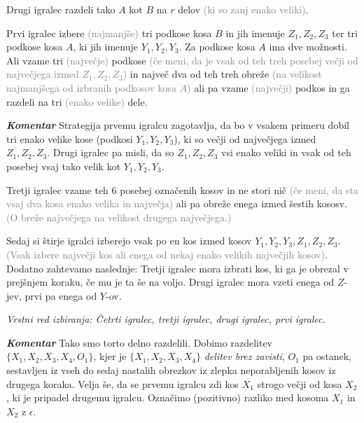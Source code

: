 \documentclass[a4paper,12pt]{article}
\begin{document}
\begin{protokol}
\item Drugi igralec razdeli tako $A$ kot $B$ na $r$ delov \textcolor{gray}{(ki so zanj enako veliki)}.

\item Prvi igralec izbere \textcolor{gray}{(najmanjše)} tri podkose kosa $B$ in jih imenuje $Z_1, Z_2, Z_3$ ter tri podkose kosa $A$, ki jih imenuje $Y_1, Y_2, Y_3$. Za podkose kosa $A$ ima dve možnosti. Ali vzame tri \textcolor{gray}{(največje)} podkose \textcolor{gray}{(če meni, da je vsak od teh treh posebej večji od največjega izmed $Z_1, Z_2, Z_3$)} in največ dva od teh treh obreže \textcolor{gray}{(na velikost najmanjšega od izbranih podkosov kosa $A$)} ali pa vzame \textcolor{gray}{(največji)} podkos in ga razdeli na tri \textcolor{gray}{(enako velike)} dele.

\item [\textbf{\em Komentar}] Strategija prvemu igralcu zagotavlja, da bo v vsakem primeru dobil tri enako velike kose (podkosi $Y_1, Y_2, Y_3$), ki so večji od največjega izmed $Z_1, Z_2, Z_3$. Drugi igralec pa misli, da so $Z_1, Z_2, Z_3$ vsi enako veliki in vsak od teh posebej vsaj tako velik kot $Y_1, Y_2, Y_3$.

\item Tretji igralec vzame teh 6 posebej označenih kosov in ne stori nič \textcolor{gray}{(če meni, da sta vsaj dva kosa enako velika in največja)} ali pa obreže enega izmed šestih kososv. \textcolor{gray}{(O breže največjega na velikost drugega največjega.)}

\item  Sedaj si štirje igralci izberejo vsak po en kos izmed kosov $Y_1, Y_2, Y_3, Z_1, Z_2, Z_3$. \textcolor{gray}{(Vsak izbere največji kos ali enega od nekaj enako velikih največjih kosov)}. Dodatno zahtevamo naslednje: Tretji igralec mora izbrati kos, ki ga je obrezal v prejšnjem koraku, če mu je ta še na voljo. Drugi igralec mora vzeti enega od $Z$-jev, prvi pa enega od $Y$-ov.

\textsl{Vrstni red izbiranja: Četrti igralec, tretji igralec, drugi igralec, prvi igralec.}

\item [\textbf{\em Komentar}] Tako smo torto delno razdelili. Dobimo razdelitev ${\{X_1, X_2, X_3, X_4, O_1\}}$, kjer je ${\{X_1, X_2, X_3, X_4\}}$ {\em delitev brez zavisti}, $O_1$ pa ostanek, sestavljen iz vseh do sedaj nastalih obrezkov iz zlepka neporabljenih kosov iz drugega koraka. Velja še, da se prvemu igralcu zdi kos $X_1$ strogo večji od kosa $X_2$, ki je pripadel drugemu igralcu. Označimo (pozitivno) razliko med kosoma $X_1$ in $X_2$ z $\epsilon$.


\end{protokol}
\end{document}
